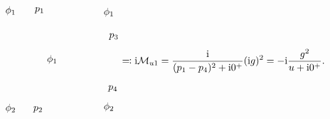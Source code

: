 \begin{equation}
\begin{gathered}
\begin{tikzpicture}[x=0.75pt,y=0.75pt,yscale=-1,xscale=1]
            \draw (134.97,84.34) node [anchor=south east] [inner sep=0.75pt]    {$\phi _{1}$};
            \draw (134.97,200.85) node [anchor=north east] [inner sep=0.75pt]    {$\phi _{2}$};
            \draw (157.98,82.05) node [anchor=south west] [inner sep=0.75pt]    {$p_{1}$};
            \draw (155.98,204.14) node [anchor=north west][inner sep=0.75pt]    {$p_{2}$};
            \draw (190.71,142.59) node [anchor=east] [inner sep=0.75pt]    {$\phi _{1}$};
            \draw (257.71,106.47) node [anchor=north west][inner sep=0.75pt]    {$p_{3}$};
            \draw (256.45,187.05) node [anchor=south west] [inner sep=0.75pt]    {$p_{4}$};
            \draw (250.45,86.34) node [anchor=south west] [inner sep=0.75pt]    {$\phi _{1}$};
            \draw (250.45,198.85) node [anchor=north west][inner sep=0.75pt]    {$\phi _{2}$};
            \end{tikzpicture}            
    \end{gathered} \eqqcolon \ii \mathcal{M}_{u1} = \frac{\ii}{(p_1 - p_4)^2 + \ii 0^+} (\ii g)^2 = - \ii \frac{g^2}{u + \ii 0^+}.
\end{equation}